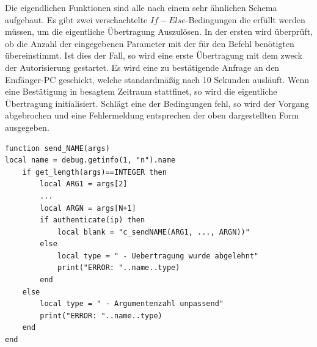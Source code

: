 \documentclass[12pt, a4paper]{scrartcl}
\begin{document}
Die eigendlichen Funktionen sind alle nach einem sehr ähnlichen Schema aufgebaut. Es gibt zwei verschachtelte $If-Else$-Bedingungen die erfüllt werden müssen, um die eigentliche Übertragung Auszulösen. In der ersten wird überprüft, ob die Anzahl der eingegebenen Parameter mit der für den Befehl benötigten übereinstimmt. Ist dies der Fall, so wird eine erste Übertragung mit dem zweck der Autorisierung gestartet. Es wird eine zu bestätigende Anfrage an den Emfänger-PC geschickt, welche standardmäßig nach 10 Sekunden ausläuft. Wenn eine Bestätigung in besagtem Zeitraum stattfinet, so wird die eigentliche Übertragung initialisiert. Schlägt eine der Bedingungen fehl, so wird der Vorgang abgebrochen und eine Fehlermeldung entsprechen der oben dargestellten Form ausgegeben.
\begin{lstlisting}[caption = {Beispielhafte Sende Funktion}]
function send_NAME(args)
local name = debug.getinfo(1, "n").name
    if get_length(args)==INTEGER then
        local ARG1 = args[2]
        ...
        local ARGN = args[N+1]
        if authenticate(ip) then
            local blank = "c_sendNAME(ARG1, ..., ARGN))"
        else
        	local type = " - Uebertragung wurde abgelehnt"
            print("ERROR: "..name..type)
        end
    else
    	local type = " - Argumentenzahl unpassend"
        print("ERROR: "..name..type)
    end
end
\end{lstlisting}
\newpage
\end{document}

